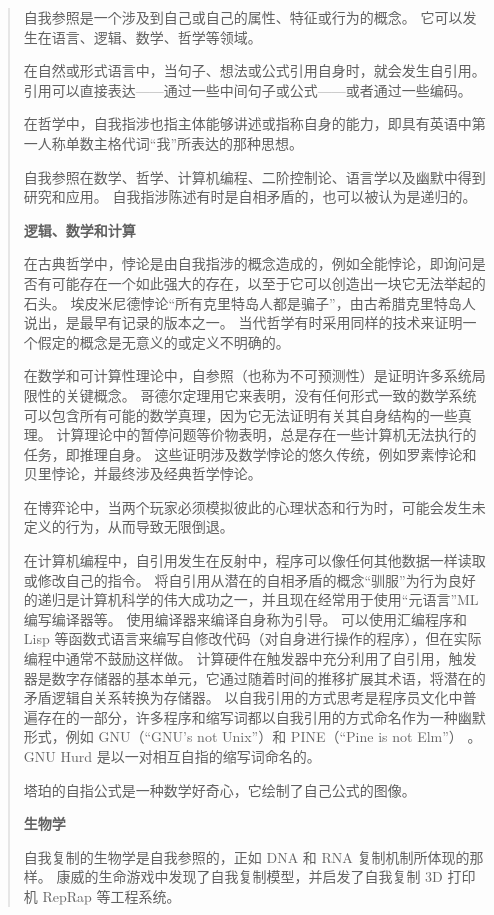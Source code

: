 \begin{quote}
自我参照是一个涉及到自己或自己的属性、特征或行为的概念。
它可以发生在语言、逻辑、数学、哲学等领域。

在自然或形式语言中，当句子、想法或公式引用自身时，就会发生自引用。
引用可以直接表达------通过一些中间句子或公式------或者通过一些编码。

在哲学中，自我指涉也指主体能够讲述或指称自身的能力，即具有英语中第一人称单数主格代词``我''所表达的那种思想。

自我参照在数学、哲学、计算机编程、二阶控制论、语言学以及幽默中得到研究和应用。
自我指涉陈述有时是自相矛盾的，也可以被认为是递归的。

\textbf{逻辑、数学和计算}

在古典哲学中，悖论是由自我指涉的概念造成的，例如全能悖论，即询问是否有可能存在一个如此强大的存在，以至于它可以创造出一块它无法举起的石头。
埃皮米尼德悖论``所有克里特岛人都是骗子''，由古希腊克里特岛人说出，是最早有记录的版本之一。
当代哲学有时采用同样的技术来证明一个假定的概念是无意义的或定义不明确的。

在数学和可计算性理论中，自参照（也称为不可预测性）是证明许多系统局限性的关键概念。
哥德尔定理用它来表明，没有任何形式一致的数学系统可以包含所有可能的数学真理，因为它无法证明有关其自身结构的一些真理。
计算理论中的暂停问题等价物表明，总是存在一些计算机无法执行的任务，即推理自身。
这些证明涉及数学悖论的悠久传统，例如罗素悖论和贝里悖论，并最终涉及经典哲学悖论。

在博弈论中，当两个玩家必须模拟彼此的心理状态和行为时，可能会发生未定义的行为，从而导致无限倒退。

在计算机编程中，自引用发生在反射中，程序可以像任何其他数据一样读取或修改自己的指令。
将自引用从潜在的自相矛盾的概念``驯服''为行为良好的递归是计算机科学的伟大成功之一，并且现在经常用于使用``元语言''ML
编写编译器等。 使用编译器来编译自身称为引导。 可以使用汇编程序和 Lisp
等函数式语言来编写自修改代码（对自身进行操作的程序），但在实际编程中通常不鼓励这样做。
计算硬件在触发器中充分利用了自引用，触发器是数字存储器的基本单元，它通过随着时间的推移扩展其术语，将潜在的矛盾逻辑自关系转换为存储器。
以自我引用的方式思考是程序员文化中普遍存在的一部分，许多程序和缩写词都以自我引用的方式命名作为一种幽默形式，例如
GNU（``GNU's not Unix''）和 PINE（``Pine is not Elm''） 。 GNU Hurd
是以一对相互自指的缩写词命名的。

塔珀的自指公式是一种数学好奇心，它绘制了自己公式的图像。

\textbf{生物学}

自我复制的生物学是自我参照的，正如 DNA 和 RNA 复制机制所体现的那样。
康威的生命游戏中发现了自我复制模型，并启发了自我复制 3D 打印机 RepRap
等工程系统。


\end{quote}
